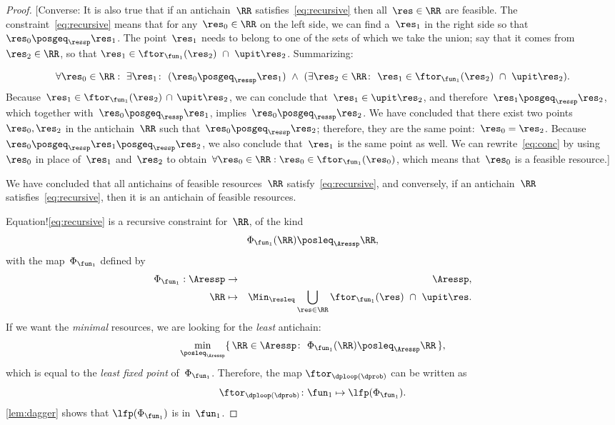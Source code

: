 \begin{proof}
  {[}Converse: It is also true that if an antichain~$\RR$ satisfies~\cref{eq:recursive}
  then all~$\res\in\RR$ are feasible. The constraint~\cref{eq:recursive}
  means that for any~$\res_{0}\in\RR$ on the left side, we can find
  a~$\res_{1}$ in the right side so that~$\res_{0}\posgeq_{\ressp}\res_{1}$.
  The point~$\res_{1}$ needs to belong to one of the sets of which
  we take the union; say that it comes from $\res_{2}\in\RR$, so
  that $\res_{1}\in\ftor_{\fun_{1}}(\res_{2})\ \cap\ \upit\res_{2}$.
  Summarizing:

    {\footnotesize{}
    \begin{equation}
      \forall\res_{0}\in\RR:\ \exists\res_{1}\colon\ (\res_{0}\posgeq_{\ressp}\res_{1})\ \wedge\ (\exists\res_{2}\in\RR\colon\ \res_{1}\in\ftor_{\fun_{1}}(\res_{2})\ \cap\ \upit\res_{2}).\label{eq:conc}
    \end{equation}
  }Because~$\res_{1}\in\ftor_{\fun_{1}}(\res_{2})\,\cap\,\upit\res_{2}$,
  we can conclude that~$\res_{1}\in\upit\res_{2}$, and therefore~$\res_{1}\posgeq_{\ressp}\res_{2}$,
  which together with~$\res_{0}\posgeq_{\ressp}\res_{1}$, implies~$\res_{0}\posgeq_{\ressp}\res_{2}$.
  We have concluded that there exist two points~$\res_{0},\res_{2}$
  in the antichain~$\RR$ such that~$\res_{0}\posgeq_{\ressp}\res_{2}$;
  therefore, they are the same point:~$\res_{0}=\res_{2}$. Because~$\res_{0}\posgeq_{\ressp}\res_{1}\posgeq_{\ressp}\res_{2}$,
  we also conclude that~$\res_{1}$ is the same point as well. We can
  rewrite~\cref{eq:conc} by using~$\res_{0}$ in place of~$\res_{1}$
  and~$\res_{2}$ to obtain~$\forall\res_{0}\in\RR:\res_{0}\in\ftor_{\fun_{1}}(\res_{0})$,
  which means that~$\res_{0}$ is a feasible resource.{]}

  We have concluded that all antichains of feasible resources~$\RR$
  satisfy~\cref{eq:recursive}, and conversely, if an antichain~$\RR$
  satisfies~\cref{eq:recursive}, then it is an antichain of feasible
  resources.

  Equation!\cref{eq:recursive} is a recursive constraint for~$\RR$,
  of the kind
  \[
    \Phi_{\fun_{1}}(\RR)\posleq_{\Aressp}\RR,
  \]
  with the map~$\Phi_{\fun_{1}}$ defined by
  \begin{eqnarray}
    \Phi_{\fun_{1}}:\Aressp & \rightarrow & \Aressp,\label{eq:bigphi}\\
    \RR & \mapsto & \Min_{\resleq}\bigcup_{\res\in\RR}\ftor_{\fun_{1}}(\res)\ \cap\ \upit\res.\nonumber
  \end{eqnarray}
  If we want the \emph{minimal} resources, we are looking for the \emph{least}
  antichain:
  \[
    \min_{\posleq_{\Aressp}}\{\,\RR\in\Aressp\colon\ \Phi_{\fun_{1}}(\RR)\posleq_{\Aressp}\RR\,\},
  \]
  which is equal to the \emph{least fixed point }of~$\Phi_{\fun_{1}}$.
  Therefore, the map $\ftor_{\dploop(\dprob)}$ can be written as
  \begin{equation}
    \ftor_{\dploop(\dprob)}\colon\fun_{1}\mapsto\lfp(\Phi_{\fun_{1}}).\label{eq:loop_fixpoint}
  \end{equation}
  \cref{lem:dagger} shows that $\lfp(\Phi_{\fun_{1}})$ is \scottcontinuous
  in~$\fun_{1}$.
\end{proof}

